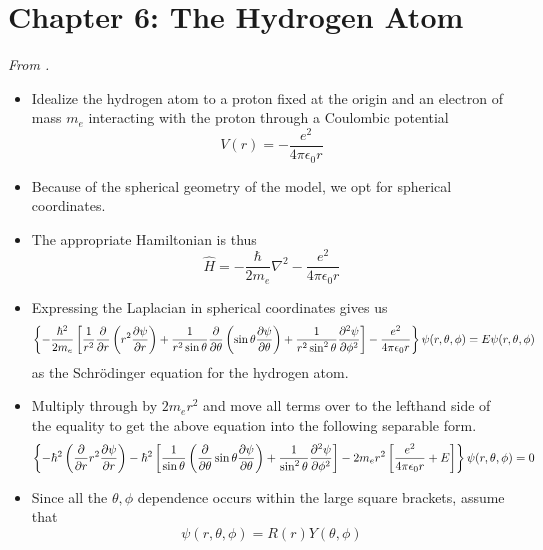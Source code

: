 \documentclass[../notes.tex]{subfiles}
\begin{document}
\section{Chapter 6: The Hydrogen Atom}
\emph{From \textcite{bib:McQuarrieSimon}.}
\begin{itemize}
    \item {}Idealize the hydrogen atom to a proton fixed at the origin and an electron of mass $m_e$ interacting with the proton through a Coulombic potential
    \begin{equation*}
        V(r) = -\frac{e^2}{4\pi\epsilon_0r}
    \end{equation*}
    \item Because of the spherical geometry of the model, we opt for spherical coordinates.
    \item The appropriate Hamiltonian is thus
    \begin{equation*}
        \hat{H} = -\frac{\hbar}{2m_e}\nabla^2-\frac{e^2}{4\pi\epsilon_0r}
    \end{equation*}
    \item Expressing the Laplacian in spherical coordinates gives us
    \begin{equation*}
        \left\{ -\frac{\hbar^2}{2m_e}\left[ \frac{1}{r^2}\pdv{r}\left( r^2\pdv{\psi}{r} \right)+\frac{1}{r^2\sin\theta}\pdv{\theta}\left( \sin\theta\pdv{\psi}{\theta} \right)+\frac{1}{r^2\sin^2\theta}\pdv[2]{\psi}{\phi} \right]-\frac{e^2}{4\pi\epsilon_0r} \right\}\psi(r,\theta,\phi) = E\psi(r,\theta,\phi)
    \end{equation*}
    as the Schr\"{o}dinger equation for the hydrogen atom.
    \item Multiply through by $2m_er^2$ and move all terms over to the lefthand side of the equality to get the above equation into the following separable form.
    \begin{equation*}
        \left\{ -\hbar^2\left( \pdv{r}r^2\pdv{\psi}{r} \right)-\hbar^2\left[ \frac{1}{\sin\theta}\left( \pdv{\theta}\sin\theta\pdv{\psi}{\theta} \right)+\frac{1}{\sin^2\theta}\pdv[2]{\psi}{\phi} \right]-2m_er^2\left[ \frac{e^2}{4\pi\epsilon_0r}+E \right] \right\}\psi(r,\theta,\phi) = 0
    \end{equation*}
    \item Since all the $\theta,\phi$ dependence occurs within the large square brackets, assume that
    \begin{equation*}
        \psi(r,\theta,\phi) = R(r)Y(\theta,\phi)
    \end{equation*}

\end{itemize}
\end{document}
